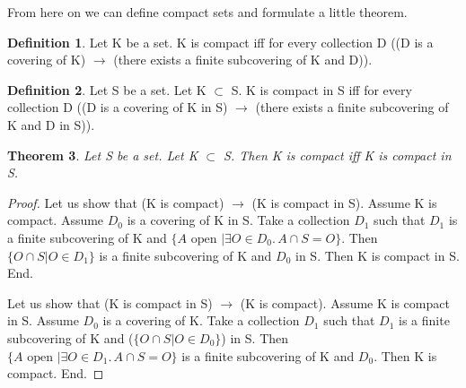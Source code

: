 \documentclass[10pt]{article}
\newenvironment{forthel}{\begin{leftbar}}{\end{leftbar}}
\newcommand{\embed}[2]{ \{ A \text{ open } | \exists O\in #1 .\, A\cap #2 = O\}}
\newcommand{\capcap}[2]{ \{ O\cap #2 | O \in #1 \}}
\newcommand{\var}[2]{ #1_{#2}}
\newtheorem{theorem}{Theorem}[section]
\theoremstyle{definition}
\newtheorem{definition}[theorem]{Definition}
\theoremstyle{plain}
\theoremstyle{remark}
\begin{document}
From here on we can define compact sets and formulate a little theorem.
\begin{forthel}
\begin{definition}
	Let K be a set. 
	K is compact iff for every collection D ((D is a covering of K) $\rightarrow$ (there exists a finite subcovering of K and D)).
\end{definition}

\begin{definition}
	Let S be a set. Let K $\subset$ S. K is compact in S iff for every collection D ((D is a covering of K in S) $\rightarrow$ (there exists a finite subcovering of K and D in S)).
\end{definition}

\begin{theorem}
	Let S be a set. Let K $\subset$ S. Then K is compact iff K is compact in S.
\end{theorem}
\begin{proof}

	Let us show that (K is compact) $\rightarrow$ (K is compact in S).
		Assume K is compact. Assume $\var D0$ is a covering of K in S.
		Take a collection $\var D1$ such that $\var D1$ is a finite subcovering of K and $\embed{\var D0}{S}$.
		Then $\capcap{\var D1}{S}$ is a finite subcovering of K and $\var D0$ in S.
		Then K is compact in S.
	End.

	Let us show that (K is compact in S) $\rightarrow$ (K is compact).
		Assume K is compact in S. Assume $\var D0$ is a covering of K.
		Take a collection $\var D1$ such that $\var D1$ is a finite subcovering of K and ($\capcap{\var D0}{S}$) in S.
		Then $\embed{\var D1}{S}$ is a finite subcovering of K and $\var D0$.
		Then K is compact.
	End.
\end{proof}
\end{forthel}
\end{document}
